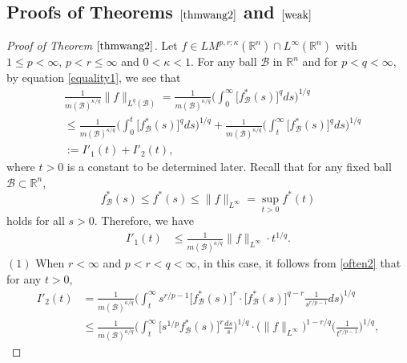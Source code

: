 \documentclass{birkjour}
\theoremstyle{definition}
\theoremstyle{remark}
\numberwithin{equation}{section}
\begin{document}
\subsection{Proofs of Theorems $\ref{thmwang2}$ and $\ref{weak}$}
\begin{proof}[Proof of Theorem $\ref{thmwang2}$]
Let $f\in LM^{p,r;\kappa}(\mathbb R^n)\cap{L^\infty}(\mathbb R^n)$ with $1\leq p<\infty$, $p<r\leq\infty$ and $0<\kappa<1$. For any ball $\mathcal{B}$ in $\mathbb R^n$ and for $p<q<\infty$, by equation \eqref{equality1}, we see that
\begin{equation*}
\begin{split}
&\frac{1}{m(\mathcal{B})^{\kappa/q}}\|f\|_{L^{q}(\mathcal{B})}
=\frac{1}{m(\mathcal{B})^{\kappa/q}}\bigg(\int_0^{\infty}\big[f^{*}_{\mathcal{B}}(s)\big]^qds\bigg)^{1/q}\\
&\leq\frac{1}{m(\mathcal{B})^{\kappa/q}}\bigg(\int_0^{t}\big[f^{*}_{\mathcal{B}}(s)\big]^qds\bigg)^{1/q}
+\frac{1}{m(\mathcal{B})^{\kappa/q}}\bigg(\int_{t}^{\infty}\big[f^{*}_{\mathcal{B}}(s)\big]^qds\bigg)^{1/q}\\
&:=I'_1(t)+I'_2(t),
\end{split}
\end{equation*}
where $t>0$ is a constant to be determined later. Recall that for any fixed ball $\mathcal{B}\subset\mathbb R^n$,
\begin{equation}\label{often2}
f^{*}_{\mathcal{B}}(s)\leq f^{*}(s)\leq \|f\|_{L^{\infty}}=\sup_{t>0}f^{*}(t)
\end{equation}
holds for all $s>0$. Therefore, we have
\begin{equation*}
\begin{split}
I'_1(t)&\leq\frac{1}{m(\mathcal{B})^{\kappa/q}}\|f\|_{L^\infty}\cdot t^{1/q}.
\end{split}
\end{equation*}
$(1)$ When $r<\infty$ and $p<r<q<\infty$, in this case, it follows from \eqref{often2} that for any $t>0$,
\begin{equation*}
\begin{split}
I'_2(t)&=\frac{1}{m(\mathcal{B})^{\kappa/q}}
\bigg(\int_{t}^{\infty}s^{r/p-1}\big[f^{*}_{\mathcal{B}}(s)\big]^{r}
\cdot\big[f^{*}_{\mathcal{B}}(s)\big]^{q-r}\frac{1}{s^{r/p-1}}ds\bigg)^{1/q}\\
&\leq\frac{1}{m(\mathcal{B})^{\kappa/q}}
\bigg(\int_{t}^{\infty}\Big[s^{1/p}f^{*}_{\mathcal{B}}(s)\Big]^r\frac{ds}{s}\bigg)^{1/q}
\cdot\big(\|f\|_{L^\infty}\big)^{1-r/q}\Big(\frac{1}{t^{r/p-1}}\Big)^{1/q},
\end{split}

\end{equation*}
\end{proof}
\end{document}
